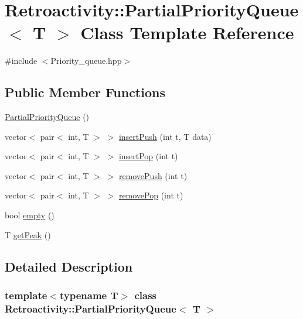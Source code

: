 \hypertarget{classRetroactivity_1_1PartialPriorityQueue}{}\section{Retroactivity\+:\+:Partial\+Priority\+Queue$<$ T $>$ Class Template Reference}
\label{classRetroactivity_1_1PartialPriorityQueue}


{\ttfamily \#include $<$Priority\+\_\+queue.\+hpp$>$}

\subsection*{Public Member Functions}
\begin{DoxyCompactItemize}
\item 
\hyperlink{classRetroactivity_1_1PartialPriorityQueue_a3619069dac07012d7da62552aa95b407}{Partial\+Priority\+Queue} ()
\item 
vector$<$ pair$<$ int, T $>$ $>$ \hyperlink{classRetroactivity_1_1PartialPriorityQueue_aeeb8ac70ed65a8110fa74d14311ef038}{insert\+Push} (int t, T data)
\item 
vector$<$ pair$<$ int, T $>$ $>$ \hyperlink{classRetroactivity_1_1PartialPriorityQueue_a4e66874ab3f2b88c5d45dc50acf09386}{insert\+Pop} (int t)
\item 
vector$<$ pair$<$ int, T $>$ $>$ \hyperlink{classRetroactivity_1_1PartialPriorityQueue_aa999f060161fb3f1f87a6f31010df8af}{remove\+Push} (int t)
\item 
vector$<$ pair$<$ int, T $>$ $>$ \hyperlink{classRetroactivity_1_1PartialPriorityQueue_a52de0058dfbd1d4d2ca38af42302fe04}{remove\+Pop} (int t)
\item 
bool \hyperlink{classRetroactivity_1_1PartialPriorityQueue_affda050c80b31b4de940183a1b143f59}{empty} ()
\item 
T \hyperlink{classRetroactivity_1_1PartialPriorityQueue_a354d975ff01dea8ea138294efb961fc9}{get\+Peak} ()
\end{DoxyCompactItemize}


\subsection{Detailed Description}
\subsubsection*{template$<$typename T$>$\newline
class Retroactivity\+::\+Partial\+Priority\+Queue$<$ T $>$}

